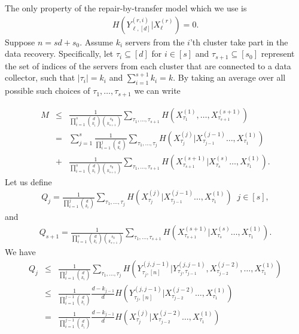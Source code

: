 \documentclass[journal,onecolumn,draftcls]{IEEEtran}
\begin{document}
\begin{IEEEproof}
The only property of the repair-by-transfer model which we use is \begin{eqnarray}
H( Y^{(r,i)}_{\ell,[d]} | X^{(r)}_\ell ) = 0.
\label{eqn:theonlyrequirement}
\end{eqnarray}
 Suppose $n = sd + s_0$.  Assume $k_i$ servers from the $i$'th cluster take part in the data recovery. Specifically, let $\tau_{i}\subseteq [d]$ for $i\in[s]$ and $\tau_{s+1}\subseteq [s_0]$  represent the set of indices of the servers from each cluster that are connected to a data collector, such that $|\tau_i| = k_i$ and $\sum_{i=1}^{s+1} k_i = k$. By taking an average over all possible such choices of $\tau_1,\dots,\tau_{s+1}$ we can write 

\begin{eqnarray}
M&\le& \frac{1}{\prod_{i =1}^{s}{d \choose k_i}{s_0 \choose k_{s+1}}}\sum_{\tau_1,\dots,\tau_{s+1}}H(X^{(1)}_{\tau_1},\dots,X^{(s+1)}_{\tau_{s+1}})\nonumber\\
&=& \sum_{j =1}^{s}\frac{1}{\prod_{i =1}^j{d \choose k_i}}\sum_{{\tau_1,\dots,\tau_j}}H(X^{(j)}_{\tau_j}|X^{(j-1)}_{\tau_{j-1}}\dots,X^{(1)}_{\tau_1})\\
&+& \frac{1}{\prod_{i =1}^{s}{d \choose k_i}{s_0\choose k_{s+1}}}\sum_{{\tau_1,\dots,\tau_{s+1}}}H(X^{(s+1)}_{\tau_{s+1}}|X^{(s)}_{\tau_{s}}\dots,X^{(1)}_{\tau_1}).
\label{eqn:sadasdqw}
\end{eqnarray}
Let us define
\begin{eqnarray*}
Q_j  = \frac{1}{\prod_{i =1}^j{d \choose k_i}}\sum_{{\tau_1,\dots,\tau_j}}H(X^{(j)}_{\tau_j}|X^{(j-1)}_{\tau_{j-1}}\dots,X^{(1)}_{\tau_1}) \;\; j\in [s],
\end{eqnarray*}
and 
\begin{eqnarray*}
Q_{s+1} = \frac{1}{\prod_{i =1}^s{d \choose k_i}{s_0\choose k_{s+1}}}\sum_{{\tau_1,\dots,\tau_{s+1}}}H(X^{(s+1)}_{\tau_{s+1}}|X^{(s)}_{\tau_{s}}\dots,X^{(1)}_{\tau_1}).
\end{eqnarray*}
We have
\begin{eqnarray*}
Q_j &\le& \frac{1}{\prod_{i =1}^j{d \choose k_i}}\sum_{{\tau_1,\dots,\tau_j}}H(Y^{(j,j-1)}_{\tau_j,[n]}|Y^{(j,j-1)}_{\tau_j,\tau_{j-1}},X^{(j-2)}_{\tau_{j-2}},\dots,X^{(1)}_{\tau_1})\\
&\le& \frac{1}{\prod_{i =1}^{j-1}{d \choose k_i}}\frac{d-k_{j-1}}{d}H(Y^{(j,j-1)}_{\tau_j,[n]}|X^{(j-2)}_{\tau_{j-2}}\dots,X^{(1)}_{\tau_1})\\
&=& \frac{1}{\prod_{i =1}^{j-1}{d \choose k_i}}\frac{d-k_{j-1}}{d}H(X^{(j)}_{\tau_j}|X^{(j-2)}_{\tau_{j-2}}\dots,X^{(1)}_{\tau_1})\\

\end{eqnarray*}
\end{IEEEproof}
\end{document}
